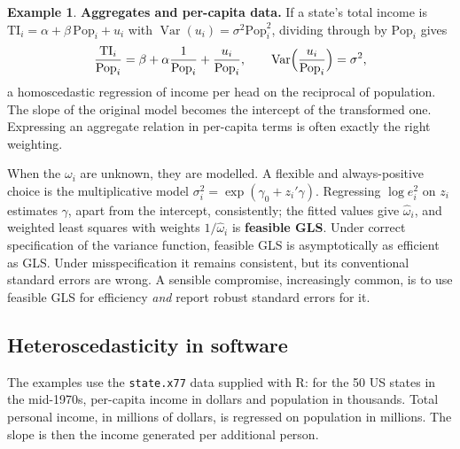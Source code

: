 \documentclass[11pt,a4paper]{article}
\numberwithin{equation}{section}
\DeclareMathOperator{\Var}{Var}
\theoremstyle{definition}
\newtheorem{exa}[thm]{Example}
\begin{document}
\begin{exa}
\label{ex:percapita}
\textbf{Aggregates and per-capita data.} If a state's total income is $\text{TI}_i = \alpha + \beta\,\text{Pop}_i + u_i$ with $\Var(u_i) = \sigma^2\text{Pop}_i^2$, dividing through by
$\text{Pop}_i$ gives
\[
\frac{\text{TI}_i}{\text{Pop}_i} = \beta + \alpha\frac{1}{\text{Pop}_i} + \frac{u_i}{\text{Pop}_i}, \qquad \Var\Bigl(\frac{u_i}{\text{Pop}_i}\Bigr) = \sigma^2 ,
\]
a homoscedastic regression of income per head on the reciprocal of population. The slope of the original model becomes the intercept of the
transformed one. Expressing an aggregate relation in per-capita terms is often exactly the right weighting.
\end{exa}

When the $\omega_i$ are unknown, they are modelled. A flexible and always-positive choice is the multiplicative model $\sigma_i^2 = \exp(\gamma_0 + z_i'\gamma)$.
Regressing $\log e_i^2$ on $z_i$ estimates $\gamma$, apart from the intercept, consistently; the fitted values give $\hat\omega_i$, and weighted least squares with
weights $1/\hat\omega_i$ is \textbf{feasible GLS}. Under correct specification of the variance function, feasible GLS is asymptotically as efficient as GLS.
Under misspecification it remains consistent, but its conventional standard errors are wrong. A sensible compromise, increasingly common, is
to use feasible GLS for efficiency \emph{and} report robust standard errors for it.

\subsection{Heteroscedasticity in software}
\label{ssec:software10}

The examples use the \texttt{state.x77} data supplied with R: for the 50 US states in the mid-1970s, per-capita income in dollars and population in
thousands. Total personal income, in millions of dollars, is regressed on population in millions. The slope is then the income generated per
additional person.
\end{document}
